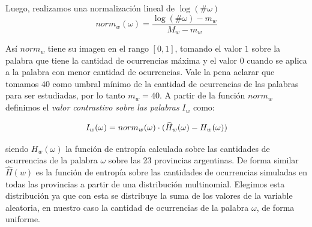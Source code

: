 Luego, realizamos una normalización lineal de $\log(\# \omega)$ 
\begin{equation}
  norm_w(\omega) = \frac{\log(\# \omega) - m_w}{M_w - m_w}
\end{equation}








Así $norm_w$ tiene su imagen en el rango $[0,1]$, tomando el valor $1$ sobre la palabra que tiene la cantidad de ocurrencias máxima y el valor $0$ cuando se aplica a la palabra con menor cantidad de ocurrencias. Vale la pena aclarar que tomamos $40$ como umbral mínimo de la cantidad de ocurrencias de las palabras para ser estudiadas, por lo tanto $m_w = 40 $.
A partir de la función $norm_w$ definimos el \textit{valor contrastivo sobre las palabras} $I_w$ como:

\begin{equation}
I_w(\omega) = norm_{w}(\omega) \cdot (\widehat{H}_{w}(\omega) - H_{w}(\omega)) \\
\label{eq:iw}
\end{equation}

siendo $H_w(\omega)$ la función de entropía calculada sobre las cantidades de ocurrencias de la palabra $\omega$ sobre las 23 provincias argentinas. De forma similar $\widehat{H}(w)$ es la función de entropía sobre las cantidades de ocurrencias simuladas en todas las provincias a partir de una distribución multinomial. Elegimos esta distribución ya que con esta se distribuye la suma de los valores de la variable aleatoria, en nuestro caso la cantidad de ocurrencias de la palabra $\omega$, de forma uniforme.%

